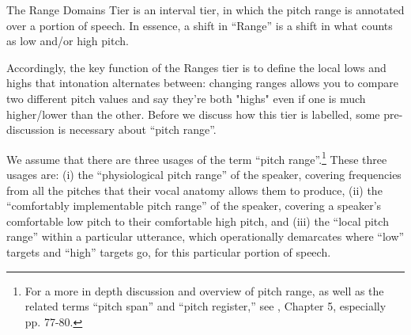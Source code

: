 The Range Domains Tier is an interval tier, in which the pitch range is annotated over a portion of speech. In essence, a shift in “Range” is a shift in what counts as low and/or high pitch.

Accordingly, the key function of the Ranges tier is to define the local lows and highs that intonation alternates between: changing ranges allows you to compare two different pitch values and say they’re both "highs" even if one is much higher\slash lower than the other. Before we discuss how this tier is labelled, some pre-discussion is necessary about “pitch range”.

We assume that there are three usages of the term “pitch range”.\footnote{For a more in depth discussion and overview of pitch range, as well as the related terms “pitch span” and “pitch register,” see \citealt{gussenhoven04}, Chapter 5, especially pp. 77-80.} These three usages are: (i) the “physiological pitch range” of the speaker, covering frequencies from all the pitches that their vocal anatomy allows them to produce, (ii) the “comfortably implementable pitch range” of the speaker, covering a speaker’s comfortable low pitch to their comfortable high pitch, and (iii) the “local pitch range” within a particular utterance, which operationally demarcates where “low” targets and “high” targets go, for this particular portion of speech.

